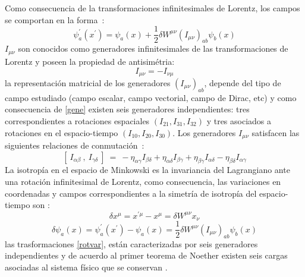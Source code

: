\documentclass[a4paper,12pt]{article}
\begin{document}
Como consecuencia de la transformaciones infinitesimales de Lorentz, los campos se comportan en la \mbox{forma \cite{noether,greiner}:}
\begin{equation}
\psi_{a}^{'}(x^{'})=\psi_{a}(x)+\frac{1}{2}\delta W^{\mu \nu}(I_{\mu \nu})_{ab}\psi_{b}(x)
\end{equation}
$I_{\mu \nu}$ son conocidos como generadores infinitesimales de las transformaciones de Lorentz y poseen la propiedad de antisimétria:
\begin{equation}
I_{\mu \nu}=-I_{\nu\mu} 
\label{gene}
\end{equation}
la representación matricial de los generadores $(I_{\mu \nu})_{ab}$, depende del tipo de \mbox{campo} estudiado (campo escalar, campo vectorial, campo de Dirac, etc) y \mbox{como} \mbox{consecuencia} de \eqref{gene} existen seis generadores independientes: tres \mbox{correspondientes} a rotaciones espaciales $(I_{21}, I_{31}, I_{32})$ y tres asociados a rotaciones en el \mbox{espacio-tiempo} $(I_{10}, I_{20}, I_{30})$. Los generadores  $I_{\mu \nu}$ satisfacen las siguientes \mbox{relaciones} de \mbox{conmutación \cite{greiner}:}
\begin{equation}
\left[\ I_{\alpha\beta}\ ,\ I_{\gamma\delta}\ \right]\ =\ -\eta_{\alpha\gamma}I_{\beta\delta}+\eta_{\alpha\delta}I_{\beta\gamma}+\eta_{\beta\gamma}I_{\alpha\delta}-\eta_{\beta\delta}I_{\alpha\gamma} 
\end{equation}
La isotropía en el espacio de Minkowski es la invariancia del Lagrangiano ante una rotación infinitesimal de Lorentz, como consecuencia, las variaciones en coordenadas y campos correspondientes a la simetría de isotropía del espacio-tiempo son \cite{greiner}:
\begin{equation}
\delta x^\mu=x^{'\mu}-x^{\mu}=\delta W^{\mu \nu}x_\nu 
\label{rotvar}
\end{equation}
$$\delta \psi_a(x)=\psi_{a}^{'}(x^{'})-\psi_{a}(x)=\frac{1}{2}\delta W^{\mu \nu}(I_{\mu \nu})_{ab}\psi_{b}(x)$$
las trasformaciones \eqref{rotvar}, están caracterizadas por seis generadores independientes y de acuerdo al primer teorema de Noether existen seis cargas asociadas al sistema físico que se conservan \cite{greiner}.  
\\
\end{document}
